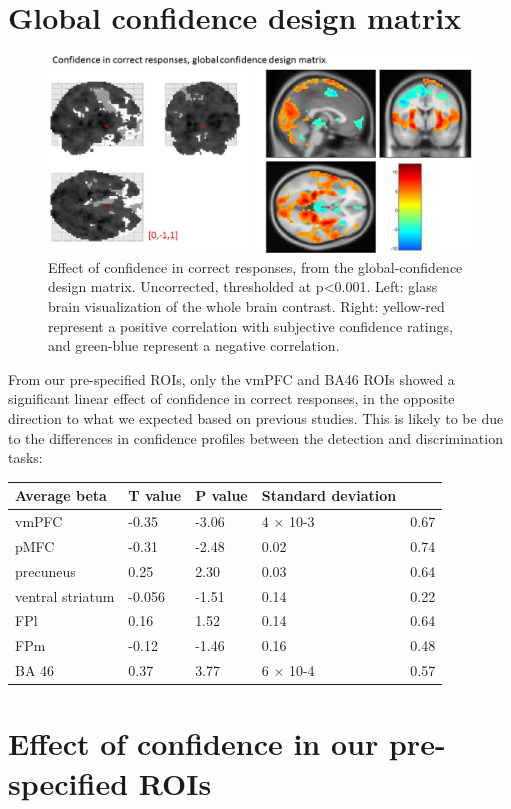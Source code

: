 \documentclass[12pt,twoside]{reedthesis}
\begin{document}
\hypertarget{app3:GC-DM}{%
\section{Global confidence design matrix}\label{app3:GC-DM}}
\begin{figure}[H]
\includegraphics[width=\linewidth]{figure/fMRI/GC-DM} \caption[Parametric effect of confidence in correct responses]{Effect of confidence in correct responses, from the global-confidence design matrix. Uncorrected, thresholded at p<0.001. Left: glass brain visualization of the whole brain contrast. Right: yellow-red represent a positive correlation with subjective confidence ratings, and green-blue represent a negative correlation.}\label{fig:GC-DM}
\end{figure}
From our pre-specified ROIs, only the vmPFC and BA46 ROIs showed a significant linear effect of confidence in correct responses, in the opposite direction to what we expected based on previous studies. This is likely to be due to the differences in confidence profiles between the detection and discrimination tasks:
\begin{longtable}[]{@{}lllll@{}}
\toprule
Average beta & T value & P value & Standard deviation &\tabularnewline
\midrule
\endhead
vmPFC & -0.35 & -3.06 & 4 × 10-3 & 0.67\tabularnewline
pMFC & -0.31 & -2.48 & 0.02 & 0.74\tabularnewline
precuneus & 0.25 & 2.30 & 0.03 & 0.64\tabularnewline
ventral striatum & -0.056 & -1.51 & 0.14 & 0.22\tabularnewline
FPl & 0.16 & 1.52 & 0.14 & 0.64\tabularnewline
FPm & -0.12 & -1.46 & 0.16 & 0.48\tabularnewline
BA 46 & 0.37 & 3.77 & 6 × 10-4 & 0.57\tabularnewline
\bottomrule
\end{longtable}
\hypertarget{app3:ROIconf}{%
\section{Effect of confidence in our pre-specified ROIs}\label{app3:ROIconf}}
\end{document}
